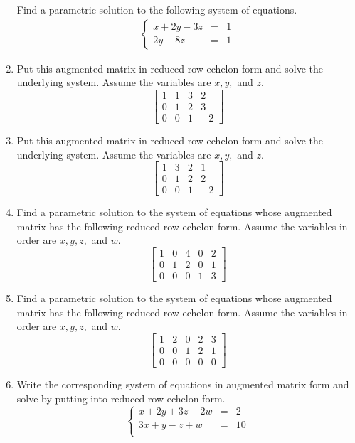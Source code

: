 \documentclass[
]{book}
\theoremstyle{definition}
\theoremstyle{definition}
\theoremstyle{definition}
\theoremstyle{definition}
\theoremstyle{remark}
\begin{document}
\begin{enumerate}
  Find a parametric solution to the following system of equations.
  \begin{align*}
  \left\{
  \begin{array}{rrc}
  x+2y-3z&=&1\\
  2y+8z&=&1
  \end{array}\right.
  \end{align*}
\item
  Put this augmented matrix in reduced row echelon form and solve the underlying system. Assume the variables are \(x,y,\) and \(z\).
  \[\left[\begin{array}{rrr|r}
  1 & 1 & 3 &  2\\
  0 & 1 & 2 &  3\\
  0 & 0 &  1 &  -2\end{array}\right] \]
\item
  Put this augmented matrix in reduced row echelon form and solve the underlying system. Assume the variables are \(x,y,\) and \(z\).
  \[\left[\begin{array}{rrr|r}
  1 & 3 & 2 &  1\\
  0 & 1 & 2 &  2\\
  0 & 0 &  1 &  -2\end{array}\right] \]
\item
  Find a parametric solution to the system of equations whose augmented matrix has the following reduced row echelon form. Assume the variables in order are \(x,y,z,\) and \(w.\)
  \[\left[\begin{array}{rrrr|r}
  1 & 0 & 4 & 0 & 2\\0 & 1 & 2 & 0 & 1\\0 & 0 & 0 & 1 & 3\end{array}\right]\]
\item
  Find a parametric solution to the system of equations whose augmented matrix has the following reduced row echelon form. Assume the variables in order are \(x,y,z,\) and \(w.\)
  \[\left[\begin{array}{rrrr|r}
  1 & 2 & 0 & 2 & 3\\0 & 0 & 1 & 2 & 1\\0 & 0 & 0 & 0 & 0\end{array}\right]\]
\item
  Write the corresponding system of equations in augmented matrix form and solve by putting into reduced row echelon form.
  \[
  \left\{
  \begin{array}{rrr}
  x+2y+3z-2w&=& 2\\
  3x+y-z+w&=&10\\

\end{array}\]
\end{enumerate}
\end{document}
